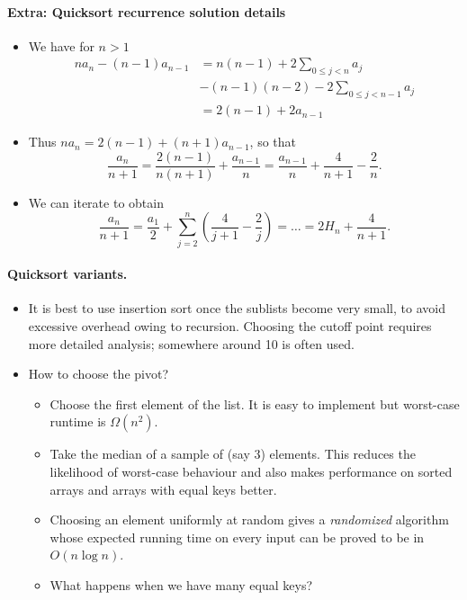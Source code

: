     
\paragraph{Extra: Quicksort recurrence solution details}
\begin{itemize}
\item  We have for $n>1$
\begin{align*}
na_n - (n-1) a_{n-1} & = n(n-1) + 2 \sum_{0\leq j < n} a_j \\
& - (n-1)(n-2) - 2\sum_{0 \leq j < n - 1} a_j \\
& = 2(n - 1) + 2 a_{n-1}
\end{align*}
\item
Thus $na_n = 2(n - 1) + (n+1)a_{n-1}$, so that 
$$
\frac{a_n}{n+1} = \frac{2(n-1)}{n(n+1)} + \frac{a_{n-1}}{n} = 
\frac{a_{n-1}}{n} + \frac{4}{n+1} - \frac{2}{n}.
$$
\item
We can iterate to obtain
$$\frac{a_n}{n+1} = \frac{a_1}{2} + \sum_{j=2}^n \left(\frac{4}{j+1} - 
\frac{2}{j}\right) = \dots = 2H_n + \frac{4}{n+1}.$$
\end{itemize}

\paragraph{Quicksort variants.}
\begin{itemize}
\item It is best to use insertion sort once the sublists become very small, to 
avoid excessive overhead owing to recursion. Choosing the cutoff point requires 
more detailed analysis; somewhere around 10 is often used.
\item How to choose the pivot? 
\begin{itemize}
\item Choose the first element of the list. It is easy to implement but
worst-case runtime is $\Omega(n^2)$.
\item Take the median of a sample of (say 3) elements. This reduces the 
likelihood of worst-case behaviour and also makes performance on sorted arrays 
and arrays with equal keys better. 
\item Choosing an element uniformly at random gives a \emph{randomized} 
algorithm whose expected running time on every input can be proved to be in 
$O(n \log n)$. 
\item What happens when we have many equal keys?
\end{itemize}
\end{itemize}



